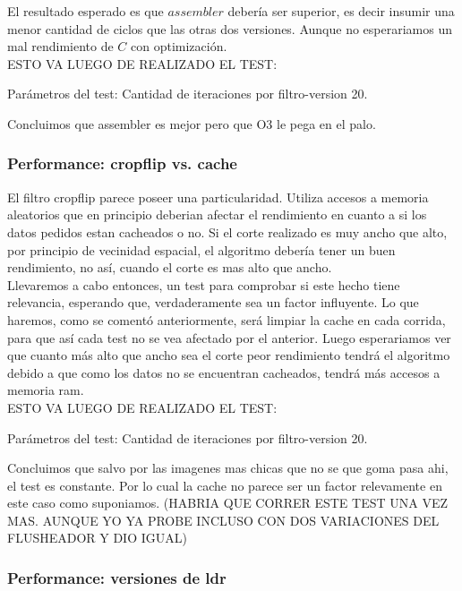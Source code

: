 El resultado esperado es que $assembler$ debería ser superior, es decir insumir una menor cantidad de ciclos que las otras dos versiones. Aunque no esperariamos un mal rendimiento de $C$ con optimización. \\

ESTO VA LUEGO DE REALIZADO EL TEST:

Parámetros del test: 
Cantidad de iteraciones por filtro-version 20.

Concluimos que assembler es mejor pero que O3 le pega en el palo. \\

\subsubsection{Performance: cropflip vs. cache}

El filtro cropflip parece poseer una particularidad. Utiliza accesos a memoria aleatorios que en principio deberian afectar el rendimiento en cuanto a si los datos pedidos estan cacheados o no. 
Si el corte realizado es muy ancho que alto, por principio de vecinidad espacial, el algoritmo debería tener un buen rendimiento, no así, cuando el corte es mas alto que ancho. \\

Llevaremos a cabo entonces, un test para comprobar si este hecho tiene relevancia, esperando que, verdaderamente sea un factor influyente.
Lo que haremos, como se comentó anteriormente, será limpiar la cache en cada corrida, para que así cada test no se vea afectado por el anterior. Luego esperariamos ver que cuanto más alto que ancho sea el corte peor rendimiento tendrá el algoritmo debido a que como los datos no se encuentran cacheados, tendrá más accesos a memoria ram. \\

ESTO VA LUEGO DE REALIZADO EL TEST:

Parámetros del test: 
Cantidad de iteraciones por filtro-version 20.

Concluimos que salvo por las imagenes mas chicas que no se que goma pasa ahi, el test es constante. Por lo cual la cache no parece ser un factor relevamente en este caso como suponiamos. (HABRIA QUE CORRER ESTE TEST UNA VEZ MAS. AUNQUE YO YA PROBE INCLUSO CON DOS VARIACIONES DEL FLUSHEADOR Y DIO IGUAL)


\subsubsection{Performance: versiones de ldr}

